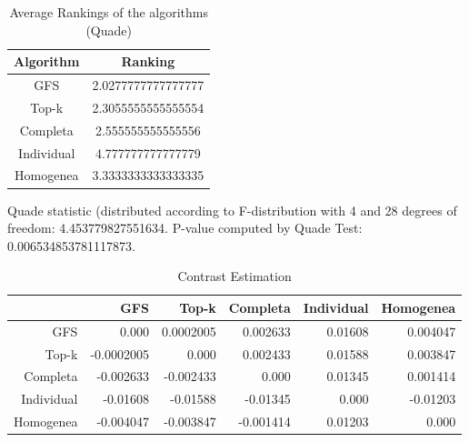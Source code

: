 \documentclass[a4paper,10pt]{article}
\begin{document}
\begin{landscape}
\newpage

\begin{table}[!htp]
\centering
\caption{Average Rankings of the algorithms (Quade)
}\begin{tabular}{c|c}
Algorithm&Ranking\\
\hline
GFS&2.0277777777777777\\
Top-k&2.3055555555555554\\
Completa&2.555555555555556\\
Individual&4.777777777777779\\
Homogenea&3.3333333333333335\\
\end{tabular}
\end{table}
Quade statistic (distributed according to F-distribution with 4 and 28 degrees of freedom: 4.453779827551634. 
P-value computed by Quade Test: 0.006534853781117873.\newline


\newpage

\begin{table}[!htp]
\centering\tiny
\caption{Contrast Estimation}
\begin{tabular}{
|r|r|r|r|r|r|}
\hline
 &GFS&Top-k&Completa&Individual&Homogenea\\
\hline
GFS&0.000&0.0002005&0.002633&0.01608&0.004047\\
\hline
Top-k&-0.0002005&0.000&0.002433&0.01588&0.003847\\
\hline
Completa&-0.002633&-0.002433&0.000&0.01345&0.001414\\
\hline
Individual&-0.01608&-0.01588&-0.01345&0.000&-0.01203\\
\hline
Homogenea&-0.004047&-0.003847&-0.001414&0.01203&0.000\\
\hline

\end{tabular}
\end{table}

\newpage


\end{landscape}
\end{document}
